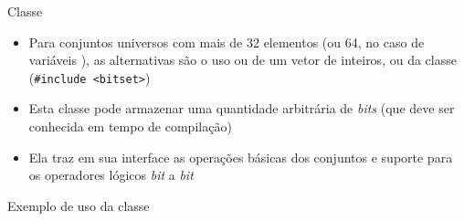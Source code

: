 \begin{frame}[fragile]{Classe }

    \begin{itemize}
        \item Para conjuntos universos com mais de 32 elementos (ou 64, no caso de variáveis ), as alternativas são o uso ou de um vetor de
            inteiros, ou da classe  (\texttt{#include <bitset>})

        \item Esta classe pode armazenar uma quantidade arbitrária de \textit{bits} (que deve ser conhecida em tempo de compilação)

        \item Ela traz em sua interface as operações básicas dos conjuntos e suporte para os operadores lógicos \textit{bit} a \textit{bit}
    \end{itemize}

\end{frame}

\begin{frame}[fragile]{Exemplo de uso da classe }
\end{frame}
